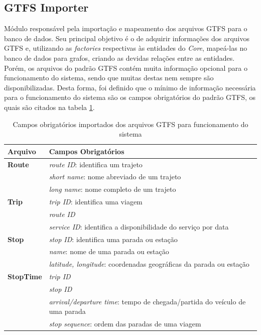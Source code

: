 \subsection{GTFS Importer}
Módulo responsável pela importação e mapeamento dos arquivos GTFS para o banco de dados. 
Seu principal objetivo é o de adquirir informações dos arquivos GTFS e, utilizando as \emph{factories} respectivas às entidades do \emph{Core}, mapeá-las no banco de dados para grafos, criando as devidas relações entre as entidades. 
Porém, os arquivos do padrão GTFS contém muita informação opcional para o funcionamento do sistema, sendo que muitas destas nem sempre são disponibilizadas. 
Desta forma, foi definido que o mínimo de informação necessária para o funcionamento do sistema são os campos obrigatórios do padrão GTFS, os quais são citados na tabela \ref{tab:campos_obrigatorios}.

\begin{table}[!htb]
	\centering
	\caption{Campos obrigatórios importados dos arquivos GTFS para funcionamento do sistema}
	\label{tab:campos_obrigatorios}
	\begin{tabular}{ll}
		\hline
		\textbf{Arquivo} & \textbf{Campos Obrigatórios} \\
		\hline
		\textbf{Route} & \emph{route ID}: identifica um trajeto \\
				    & \emph{short name}: nome abreviado de um trajeto \\
				    & \emph{long name}: nome completo de um trajeto \\
		\textbf{Trip} & \emph{trip ID}: identifica uma viagem \\ 
				& \emph{route ID} \\ 
				& \emph{service ID}: identifica a disponibilidade do serviço por data \\
		\textbf{Stop} & \emph{stop ID}: identifica uma parada ou estação \\
				 & \emph{name}: nome de uma parada ou estação \\
				 & \emph{latitude, longitude}: coordenadas geográficas da parada ou estação \\
		\textbf{StopTime} & \emph{trip ID} \\
				         & \emph{stop ID} \\
				         & \emph{arrival/departure time}: tempo de chegada/partida do veículo de uma parada \\
				         & \emph{stop sequence}: ordem das paradas de uma viagem \\
		\hline
	\end{tabular}
\end{table}


